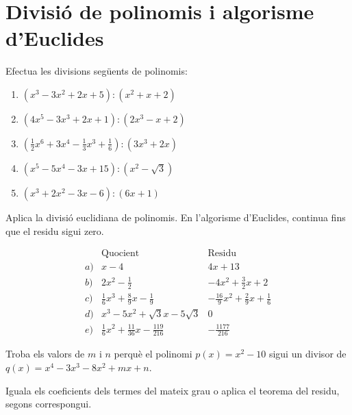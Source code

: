 \section{Divisió de polinomis i algorisme d’Euclides}

\begin{exercici}
Efectua les divisions següents de polinomis:

\begin{enumerate}
\item[a)] $(x^{3}-3x^{2}+2x+5):(x^{2}+x+2)$

\item[b)] $(4x^{5}-3x^{3}+2x+1):(2x^{3}-x+2)$

\item[c)] $\left( \frac{1}{2}x^{6}+3x^{4}-\frac{1}{3}x^{3}+\frac{1}{6}
\right):(3x^{3}+2x)$

\item[d)] $(x^{5}-5x^{4}-3x+15):(x^{2}-\sqrt{3})$

\item[e)] $(x^{3}+2x^{2}-3x-6):(6x+1)$
\end{enumerate}
\end{exercici}
\begin{indicacio}
Aplica la divisió euclidiana de polinomis. En l’algorisme d’Euclides, continua fins que el residu sigui zero.
\end{indicacio}

\begin{solucio}
\[
\begin{array}{lll}
& \text{Quocient} & \text{Residu} \\
a) & x-4 & 4x+13 \\
b) & 2x^{2}-\frac{1}{2} & -4x^{2}+\frac{3}{2}x+2 \\
c) & \frac{1}{6}x^{3}+\frac{8}{9}x-\frac{1}{9} & -\frac{16}{9}x^{2}+\frac{2}{
9}x+\frac{1}{6} \\
d) & x^{3}-5x^{2}+\sqrt{3}x-5\sqrt{3} & 0 \\
e) & \frac{1}{6}x^{2}+\frac{11}{36}x-\frac{119}{216} & -\frac{1177}{216}
\end{array}
\]
\end{solucio}

\begin{exercici}
Troba els valors de $m$ i $n$ perquè el polinomi $p(x)=x^{2}-10$
sigui un divisor de $q(x)=x^{4}-3x^{3}-8x^{2}+mx+n$.
\end{exercici}
\begin{indicacio}
Iguala els coeficients dels termes del mateix grau o aplica el teorema del residu, segons correspongui.
\end{indicacio}

